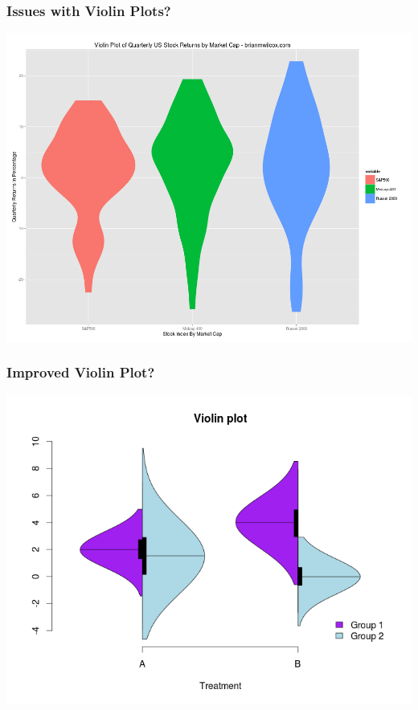 \documentclass{beamer} %
\begin{document}
\begin{frame}\frametitle{Issues with Violin Plots?}
	\centering
	\includegraphics[width=\linewidth]{violin2.png}
\end{frame}



\begin{frame}\frametitle{Improved Violin Plot?}
	\centering
	\includegraphics[width=\linewidth]{violin3.png}
\end{frame}
\end{document}
